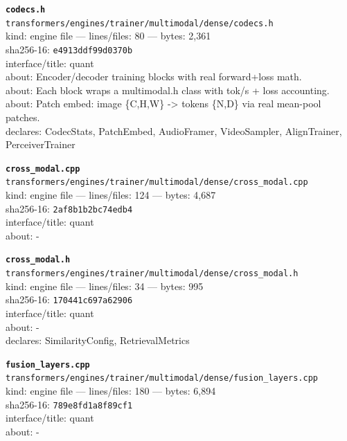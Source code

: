 \noindent\textbf{\texttt{codecs.h}}\\
\texttt{transformers/engines/trainer/multimodal/dense/codecs.h}\\
kind: engine file --- lines/files: 80 --- bytes: 2,361\\
sha256-16: \texttt{e4913ddf99d0370b}\\
interface/title: quant\\
about: Encoder/decoder training blocks with real forward+loss math.\\
about: Each block wraps a multimodal.h class with tok/s + loss accounting.\\
about: Patch embed: image \{C,H,W\} -> tokens \{N,D\} via real mean-pool patches.\\
declares: CodecStats, PatchEmbed, AudioFramer, VideoSampler, AlignTrainer, PerceiverTrainer\\
\vspace*{6.0pt}
\newpage

\noindent\textbf{\texttt{cross\_modal.cpp}}\\
\texttt{transformers/engines/trainer/multimodal/dense/cross\_modal.cpp}\\
kind: engine file --- lines/files: 124 --- bytes: 4,687\\
sha256-16: \texttt{2af8b1b2bc74edb4}\\
interface/title: quant\\
about: -\\
\vspace*{6.0pt}

\noindent\textbf{\texttt{cross\_modal.h}}\\
\texttt{transformers/engines/trainer/multimodal/dense/cross\_modal.h}\\
kind: engine file --- lines/files: 34 --- bytes: 995\\
sha256-16: \texttt{170441c697a62906}\\
interface/title: quant\\
about: -\\
declares: SimilarityConfig, RetrievalMetrics\\
\vspace*{6.0pt}

\noindent\textbf{\texttt{fusion\_layers.cpp}}\\
\texttt{transformers/engines/trainer/multimodal/dense/fusion\_layers.cpp}\\
kind: engine file --- lines/files: 180 --- bytes: 6,894\\
sha256-16: \texttt{789e8fd1a8f89cf1}\\
interface/title: quant\\
about: -\\
\vspace*{6.0pt}

